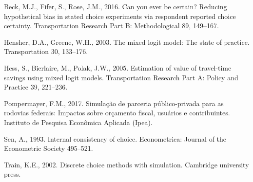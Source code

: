 \documentclass[]{elsarticle} %
\begin{document}
\hypertarget{refs}{}
\leavevmode\hypertarget{ref-beck2016can}{}%
Beck, M.J., Fifer, S., Rose, J.M., 2016. Can you ever be certain?
Reducing hypothetical bias in stated choice experiments via respondent
reported choice certainty. Transportation Research Part B:
Methodological 89, 149--167.

\leavevmode\hypertarget{ref-hensher2003mixed}{}%
Hensher, D.A., Greene, W.H., 2003. The mixed logit model: The state of
practice. Transportation 30, 133--176.

\leavevmode\hypertarget{ref-hess2005estimation}{}%
Hess, S., Bierlaire, M., Polak, J.W., 2005. Estimation of value of
travel-time savings using mixed logit models. Transportation Research
Part A: Policy and Practice 39, 221--236.

\leavevmode\hypertarget{ref-pompermayer2017simulaccao}{}%
Pompermayer, F.M., 2017. Simulação de parceria público-privada para as
rodovias federais: Impactos sobre orçamento fiscal, usuários e
contribuintes. Instituto de Pesquisa Econômica Aplicada (Ipea).

\leavevmode\hypertarget{ref-sen1993internal}{}%
Sen, A., 1993. Internal consistency of choice. Econometrica: Journal of
the Econometric Society 495--521.

\leavevmode\hypertarget{ref-train2002discrete}{}%
Train, K.E., 2002. Discrete choice methods with simulation. Cambridge
university press.
\end{document}
